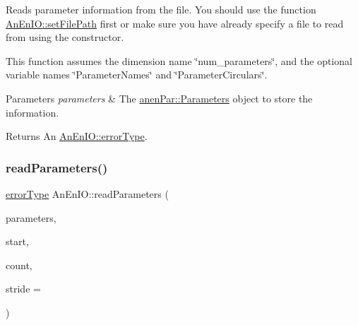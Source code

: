 Reads parameter information from the file. You should use the function \mbox{\hyperlink{class_an_en_i_o_a98066d375cc78694fda2af1ce37cc8d8}{An\+En\+I\+O\+::set\+File\+Path}} first or make sure you have already specify a file to read from using the constructor.

This function assumes the dimension name \char`\"{}num\+\_\+parameters\char`\"{}, and the optional variable names \char`\"{}\+Parameter\+Names\char`\"{} and \char`\"{}\+Parameter\+Circulars\char`\"{}.


\begin{DoxyParams}{Parameters}
{\em parameters} & The \mbox{\hyperlink{classanen_par_1_1_parameters}{anen\+Par\+::\+Parameters}} object to store the information. \\
\hline
\end{DoxyParams}
\begin{DoxyReturn}{Returns}
An \mbox{\hyperlink{class_an_en_i_o_aa56bc1ec6610b86db4349bce20f9ead0}{An\+En\+I\+O\+::error\+Type}}. 
\end{DoxyReturn}
\mbox{\label{class_an_en_i_o_a0ff7e8d615ed2127ab66b83ee78fc820}} 
\subsubsection{\texorpdfstring{read\+Parameters()}{readParameters()}\hspace{0.1cm}{\footnotesize\ttfamily [2/2]}}
{\footnotesize\ttfamily \mbox{\hyperlink{class_an_en_i_o_aa56bc1ec6610b86db4349bce20f9ead0}{error\+Type}} An\+En\+I\+O\+::read\+Parameters (\begin{DoxyParamCaption}\item[{\mbox{\hyperlink{classanen_par_1_1_parameters}{anen\+Par\+::\+Parameters}} \&}]{parameters,  }\item[{size\+\_\+t}]{start,  }\item[{size\+\_\+t}]{count,  }\item[{ptrdiff\+\_\+t}]{stride = {} }\end{DoxyParamCaption})}

\mbox{\label{class_an_en_i_o_a237d03f50bb9101c40f7842694d25c5e}} 
